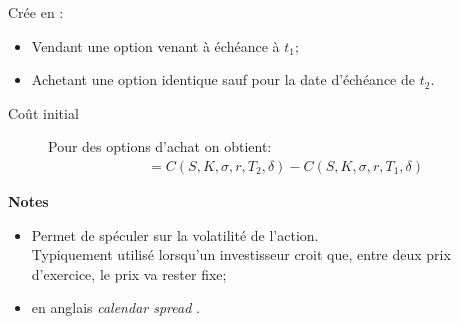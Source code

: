 \documentclass[10pt, french]{article}
\begin{document}
\begin{multicols*}{2}
\begin{definitionNOHFILL}
Crée en :
\begin{itemize}[leftmargin = *]
	\item	Vendant une option venant à échéance à $t_{1}$;
	\item	Achetant une option identique sauf pour la date d'échéance de $t_{2}$.
\end{itemize}

\begin{description}
	\item[Coût initial]	Pour des options d'achat on obtient:
		\begin{align*}
		&=	C(S, K, \sigma, r, T_{2}, \delta) - C(S, K, \sigma, r, T_{1}, \delta) 
		\end{align*}
\end{description}

\tcbline
\textbf{Notes}
\begin{itemize}[leftmargin = *]
	\item	Permet de spéculer sur la volatilité de l'action.\\
			Typiquement utilisé lorsqu'un investisseur croit que, entre deux prix d'exercice, le prix va rester fixe;
	\item	en anglais \og \textit{calendar spread} \fg{}.
\end{itemize}
\end{definitionNOHFILL}


\end{multicols*}
\end{document}
